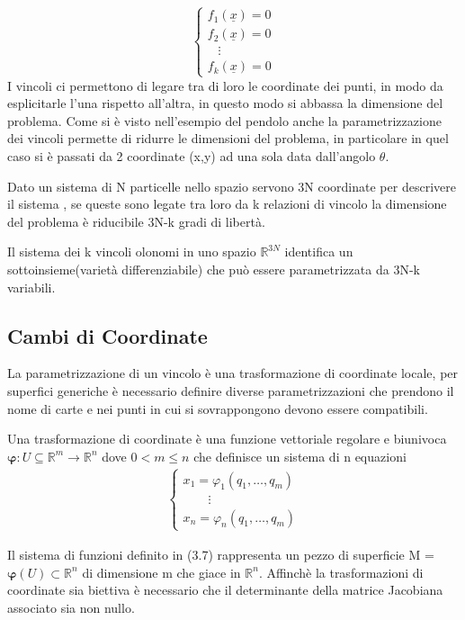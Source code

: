 \begin{equation}
\left\{\begin{array}{l}
f_1(\underline{x})=0 \\
f_2(\underline{x})=0 \\
\;\;\;\vdots \\
f_k(\underline{x})=0
\end{array}\right.
\end{equation}
I vincoli ci permettono di legare tra di loro le coordinate dei punti, in modo da esplicitarle l'una rispetto all'altra, in questo modo si abbassa la dimensione del problema. Come si \`{e} visto nell'esempio del pendolo anche la parametrizzazione dei vincoli permette di ridurre le dimensioni del problema, in particolare in quel caso si \`{e} passati da 2 coordinate (x,y) ad una sola data dall'angolo $\theta$.

\begin{definition}
	Dato un sistema di N particelle nello spazio servono 3N coordinate per descrivere il sistema , se queste sono legate tra loro da k relazioni di vincolo la dimensione del problema \`{e} riducibile 3N-k gradi di libert\`{a}.
\end{definition}

\begin{remark}
 Il sistema dei k vincoli olonomi in uno spazio $\mathbb{R}^{3N}$ identifica un sottoinsieme(variet\`{a} differenziabile) che pu\`{o} essere parametrizzata da 3N-k variabili.	
\end{remark}

\subsection{Cambi di Coordinate}
La parametrizzazione di un vincolo \`{e} una trasformazione di coordinate locale, per superfici generiche \`{e} necessario definire diverse parametrizzazioni che prendono il nome di carte e nei punti in cui si sovrappongono devono essere compatibili.

\begin{definition}
	Una trasformazione di coordinate \`{e} una funzione vettoriale regolare e biunivoca $\bm{\varphi} : U \subseteq \mathbb{R}^m \rightarrow \mathbb{R}^n$ dove $0< m \leq n$ che definisce un sistema di n equazioni  
\begin{align}
\left \{ \begin{array}{l}
 x_1=\varphi_1\left(q_1, \ldots, q_m\right) \\
 \quad \quad \vdots \\
 x_n=\varphi_n\left(q_1, \ldots, q_m\right)
\end{array} \right.
\end{align}
\end{definition}
Il sistema di funzioni definito in (3.7) rappresenta un pezzo di superficie M = $\bm{\varphi}(U) \subset \mathbb{R}^n$ di dimensione m che giace in $\mathbb{R}^n$.
Affinch\`{e} la trasformazioni di coordinate sia biettiva \`{e} necessario che il determinante della matrice Jacobiana associato sia non nullo.


